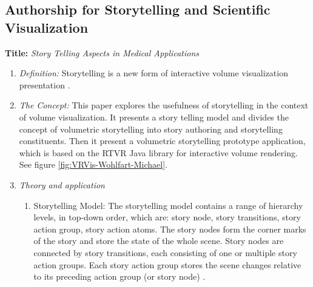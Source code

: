 \documentclass{egpubl}
\begin{document}
\subsection{Authorship for  Storytelling and Scientific Visualization}
\textbf{Title:} \textit{Story Telling Aspects in Medical Applications}
\begin{enumerate}
\item \textit{Definition:} Storytelling is a new form of interactive volume visualization presentation \cite{wohlfat}.
\item \textit{The Concept:} This paper explores the usefulness of storytelling in the context of volume visualization. It presents a story telling model and divides the concept of volumetric storytelling into story authoring and storytelling constituents. Then it present a volumetric storytelling prototype application, which is based on the RTVR Java library for interactive volume rendering. See figure \ref{fig:VRVis-Wohlfart-Michael}\cite{wohlfat}.
\item \textit{Theory and application}
\begin{enumerate}
\item Storytelling Model: The storytelling model contains a range of hierarchy levels, in top-down order, which are: story node, story transitions, story action group, story action atoms. The story nodes form the corner marks of the story and store the state of the whole scene. Story nodes are connected by story transitions, each consisting of one or multiple story action groups. Each story action group stores the scene changes relative to its preceding action group (or story node) \cite{wohlfat}.


\end{enumerate}
\end{enumerate}
\end{document}
